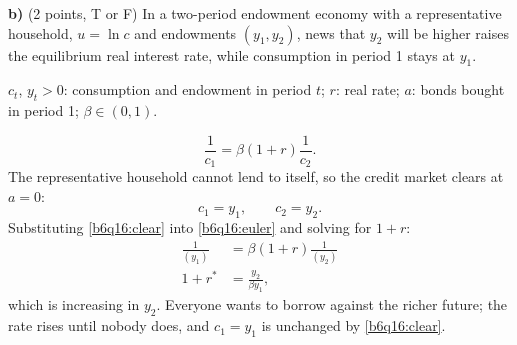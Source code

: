 \medskip
\textbf{b)} (2 points, T or F) In a two-period endowment economy with a representative household, $u=\ln c$ and endowments
$(y_1,y_2)$, news that $y_2$ will be higher raises the equilibrium real interest rate, while consumption in period 1 stays at $y_1$.
\begin{sol}
\begin{notacao}
\item $c_t$, $y_t>0$: consumption and endowment in period $t$; $r$: real rate; $a$: bonds bought in period 1; $\beta\in(0,1)$.
\end{notacao}
\begin{equation}
\frac1{c_1}=\beta(1+r)\frac1{c_2}. \label{b6q16:euler}
\end{equation}
The representative household cannot lend to itself, so the credit market clears at $a=0$:
\begin{equation}
c_1=y_1,\qquad c_2=y_2. \label{b6q16:clear}
\end{equation}
Substituting \eqref{b6q16:clear} into \eqref{b6q16:euler} and solving for $1+r$:
\begin{align}
\frac1{(y_1)}&=\beta(1+r)\frac1{(y_2)}\nonumber\\
1+r^\ast&=\frac{y_2}{\beta y_1}, \label{b6q16:r}
\end{align}
which is increasing in $y_2$. Everyone wants to borrow against the richer future; the rate rises until nobody does, and
$c_1=y_1$ is unchanged by \eqref{b6q16:clear}.
\end{sol}

